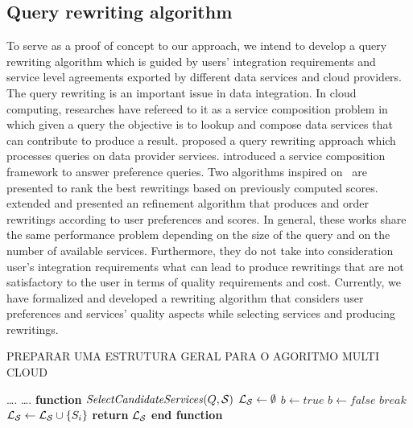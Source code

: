 
\subsection{Query rewriting algorithm}
To serve as a proof of concept to our approach, we intend to develop a query
rewriting algorithm which is guided by users' integration requirements and
service level agreements exported by different data services and cloud
providers. The query rewriting is an important issue in data integration. In
cloud computing, researches have refereed to it as a service composition problem
in which given a query the objective is to lookup and compose data services that
can contribute to produce a result. \cite{Barhamgi2010} proposed a query
rewriting approach which processes queries on data provider services.
\cite{Benouaret2011} introduced a service composition framework to answer
preference queries. Two algorithms inspired on~\cite{Barhamgi2010} are presented
to rank the best rewritings based on previously computed scores. \cite{ba2014}
extended \cite{Umberto} and presented an refinement algorithm that produces and
order rewritings according to user preferences and scores. In general, these
works share the same performance problem depending on the size of the query and
on the number of available services. Furthermore, they do not take into
consideration user's integration requirements what can lead to produce
rewritings that are not satisfactory to the user in terms of quality
requirements and cost. Currently, we have formalized and developed a rewriting
algorithm that considers user preferences and services' quality aspects while
selecting services and producing rewritings.                    

PREPARAR UMA ESTRUTURA GERAL PARA O AGORITMO MULTI CLOUD
\begin{algorithm} 
\caption{ - \ldots}
\label{qualityBasedAlgorithm}
\begin{algorithmic}[1]
\REQUIRE \ldots.
\ENSURE \ldots.
\STATE \textbf{function} $\mathit{SelectCandidateServices} (Q, \bigS)$
\STATE $\bigLS \leftarrow \emptyset$
		\STATE $b \leftarrow \mathit{true}$		
				\STATE $b \leftarrow \mathit{false}$	
				\STATE $\mathit{break}$
			\ENDIF
		\ENDFOR
			\STATE $\bigLS \leftarrow \bigLS \cup \lbrace S_{i} \rbrace$	
		\ENDIF
	\ENDIF
\ENDFOR
\STATE \textbf{return} $\bigLS$
\STATE \textbf{end function}
\end{algorithmic}
\end{algorithm} 